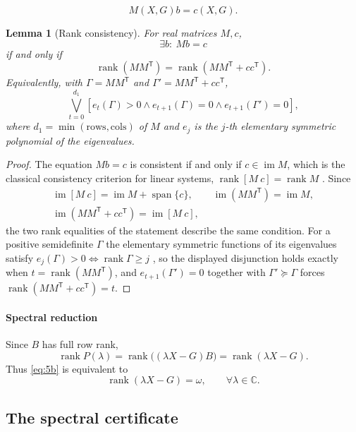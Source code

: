 \documentclass[journal]{IEEEtran}
\theoremstyle{plainn}
\newtheorem{lem}[thm]{Lemma}
\theoremstyle{remark}
\begin{document}
\begin{equation*}
M(X,G)b=c(X,G).
\end{equation*}

\begin{lem}[Rank consistency]\label{lem:rankcons}
	For real matrices $M,c$,
	\[
	\exists b:\ Mb=c
	\]
	if and only if
	\[
	\operatorname{rank}(MM^{\mathsf T})
	=\operatorname{rank}(MM^{\mathsf T}+cc^{\mathsf T}).
	\]
	Equivalently, with $\Gamma=MM^{\mathsf T}$ and
	$\Gamma'=MM^{\mathsf T}+cc^{\mathsf T}$,
	\[
	\bigvee_{t=0}^{d_1}
	\left[e_t(\Gamma)>0\wedge e_{t+1}(\Gamma)=0\wedge e_{t+1}(\Gamma')=0\right],
	\]
	where $d_1=\min(\text{rows},\text{cols})$ of $M$ and $e_j$ is the
	$j$-th elementary symmetric polynomial of the eigenvalues.
\end{lem}

\begin{proof}
The equation $Mb=c$ is consistent if and only if $c\in\operatorname{im}M$, which is the classical
consistency criterion for linear systems, $\operatorname{rank}[M\ c]=\operatorname{rank}M$
\cite[Ch.~0]{hj13}. Since
\[
\begin{gathered}
\operatorname{im}[M\ c]=\operatorname{im}M+\operatorname{span}\{c\},\qquad
\operatorname{im}(MM^{\mathsf T})=\operatorname{im}M,\\
\operatorname{im}(MM^{\mathsf T}+cc^{\mathsf T})=\operatorname{im}[M\ c],
\end{gathered}
\]
the two rank equalities of the statement describe the same condition. For a positive semidefinite
$\Gamma$ the elementary symmetric functions of its eigenvalues satisfy
$e_j(\Gamma)>0\iff\operatorname{rank}\Gamma\ge j$ \cite[Ch.~4]{hj13}, so the displayed disjunction
holds exactly when $t=\operatorname{rank}(MM^{\mathsf T})$, and
$e_{t+1}(\Gamma')=0$ together with $\Gamma'\succeq\Gamma$ forces
$\operatorname{rank}(MM^{\mathsf T}+cc^{\mathsf T})=t$.
\end{proof}

\paragraph*{Spectral reduction}\label{sec:spectral}
Since $B$ has full row rank,
\[
\operatorname{rank}P(\lambda)
=\operatorname{rank}\bigl((\lambda X-G)B\bigr)
=\operatorname{rank}(\lambda X-G).
\]
Thus \eqref{eq:5b} is equivalent to
\[
\operatorname{rank}(\lambda X-G)=\omega,\qquad\forall\lambda\in\mathbb C .
\]

\subsection{The spectral certificate}\label{sec:spectrum}
\end{document}
